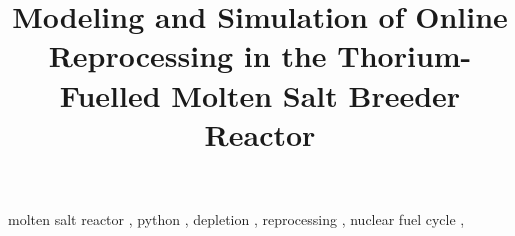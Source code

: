 \documentclass[review]{elsarticle}
\begin{document}
\begin{frontmatter}
\title{Modeling and Simulation of Online Reprocessing in the Thorium-Fuelled Molten Salt Breeder Reactor}

\date{}                     %





\begin{keyword}
molten salt reactor \sep
python \sep 
depletion \sep 
reprocessing \sep 
nuclear fuel cycle \sep
\end{keyword}


\end{frontmatter}
\glsresetall

\linenumbers


\FloatBarrier

\FloatBarrier

\FloatBarrier
%

\FloatBarrier

\FloatBarrier

\nocite{robertson_conceptual_1971} %

\end{document}
